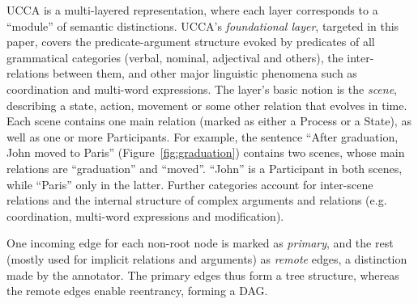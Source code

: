 \documentclass[11pt,a4paper]{article}
\newcommand{\figref}[1]{Figure~\ref{#1}}
\begin{document}
UCCA is a multi-layered representation, where each layer corresponds
to a ``module'' of semantic distinctions.
UCCA's \textit{foundational layer}, targeted in this paper, covers the predicate-argument
structure evoked by predicates of all grammatical categories
(verbal, nominal, adjectival and others), the inter-relations between them,
and other major linguistic phenomena such as coordination and multi-word expressions.
The layer's basic notion is the \textit{scene},
describing a state, action, movement or some other relation that evolves in time.
Each scene contains one main relation (marked as either a Process or a State),
as well as one or more Participants.
For example, the sentence ``After graduation, John moved to Paris'' (\figref{fig:graduation})
contains two scenes, whose main relations are ``graduation'' and ``moved''.
``John'' is a Participant in both scenes, while ``Paris'' only in the latter.
Further categories account for inter-scene relations and the internal structure of
complex arguments and relations (e.g. coordination, multi-word expressions and modification).

One incoming edge for each non-root node is marked as \textit{primary},
and the rest (mostly used for implicit relations and arguments) as \textit{remote} edges,
a distinction made by the annotator.
The primary edges thus form a tree structure, whereas the remote edges enable reentrancy,
forming a DAG.
\end{document}
